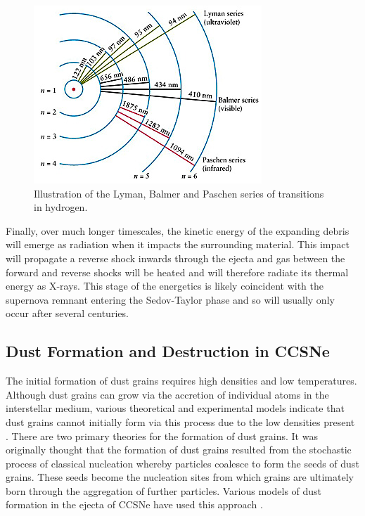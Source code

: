  \begin{figure}
\centering
\includegraphics[clip=true,scale=0.9,trim= 0 0 0 0]{chapters/chapter1/figs/balmer1.jpg}
\caption{Illustration of the Lyman, Balmer and Paschen series of transitions in hydrogen.}
\label{fig:balmer}
\end{figure}


Finally, over much longer timescales, the kinetic energy of the expanding debris will emerge as radiation when it impacts the surrounding material.  This impact will propagate a reverse shock inwards through the ejecta and gas between the forward and reverse shocks will be heated and will therefore radiate its thermal energy as X-rays.  This stage of the energetics is likely coincident with the supernova remnant entering the Sedov-Taylor phase and so will usually only occur after several centuries.  

\subsection{Dust Formation and Destruction in CCSNe}
\label{scn:dust_formation}

The initial formation of dust grains requires high densities and low temperatures.  Although dust grains can grow via the accretion of individual atoms in the interstellar medium, various theoretical and experimental models indicate that dust grains cannot initially form via this process due to the low densities present \citep{Osterbrock2006}.  There are two primary theories for the formation of dust grains.  It was originally thought that the formation of dust grains resulted from the stochastic process of classical nucleation whereby particles coalesce to form the seeds of dust grains.  These seeds become the nucleation sites from which grains are ultimately born through the aggregation of further particles.  Various models of dust formation in the ejecta of CCSNe have used this approach \citep{Kozasa1989, Todini2001,Nozawa2003, Schneider2004}.  

